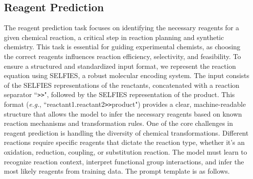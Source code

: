 \subsection{Reagent Prediction}
The reagent prediction task focuses on identifying the necessary reagents for a given chemical reaction, a critical step in reaction planning and synthetic chemistry. This task is essential for guiding experimental chemists, as choosing the correct reagents influences reaction efficiency, selectivity, and feasibility. To ensure a structured and standardized input format, we represent the reaction equation using SELFIES, a robust molecular encoding system. The input consists of the SELFIES representations of the reactants, concatenated with a reaction separator ``{\tt >>}", followed by the SELFIES representation of the product. This format (\emph{e.g.}, ``reactant1.reactant2{\tt >>}product") provides a clear, machine-readable structure that allows the model to infer the necessary reagents based on known reaction mechanisms and transformation rules.
One of the core challenges in reagent prediction is handling the diversity of chemical transformations. Different reactions require specific reagents that dictate the reaction type, whether it's an oxidation, reduction, coupling, or substitution reaction. The model must learn to recognize reaction context, interpret functional group interactions, and infer the most likely reagents from training data. The prompt template is as follows.

